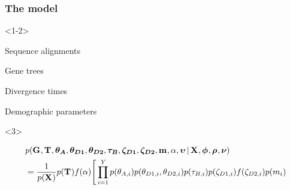 \begin{frame}[t]
    \frametitle{The \msb model}
        \begin{onlyenv}<1-2>
        \smallskip
        \begin{mydescription}
            \item[\alignmentVector] Sequence alignments
            \item[\geneTreeVector] Gene trees
            \item[\divTimeMapVector] Divergence times
            \item[\demographicParamVector] Demographic parameters
        \end{mydescription}
        \end{onlyenv}
    \begin{onlyenv}<3>
    \bigskip
    \begin{displaybox}
    {\tiny
    \begin{equation*}
        \begin{split}
        & p(\geneTreeVector,
        \divTimeMapVector,
        \ancestralThetaVector,
        \descendantThetaVector{1}, \descendantThetaVector{2},
        \bottleTimeVector, \bottleScalarVector{1},
        \bottleScalarVector{2},
        \migrationRateVector,
        \locusRateHetShapeParameter,
        \locusMutationRateScalarVector \given
        \alignmentVector, \hkyModelVector, \ploidyScalarVector,
        \mutationRateScalarConstantVector) \\
        & = \frac{1}{p(\alignmentVector)}
        p(\divTimeMapVector)
        f(\locusRateHetShapeParameter)
        \Bigg[
        \prod_{i=1}^{\npairs{}}
        p(\ancestralTheta{i})
        p(\descendantTheta{1}{i}, \descendantTheta{2}{i})
        p(\bottleTime{i})
        p(\bottleScalar{1}{i}) f(\bottleScalar{2}{i})
        p(\migrationRate{i}) \\

\end{split}
\end{equation*}}
\end{displaybox}
\end{onlyenv}
\end{frame}
